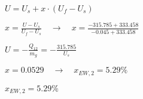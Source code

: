 \( U = U_s + x \cdot (U_f - U_s) \)  

\( x = \frac{U - U_s}{U_f - U_s} \quad \rightarrow \quad x = \frac{-315.785 + 333.458}{-0.045 + 333.458} \)  

\( U = -\frac{Q_{12}}{m_g} = -\frac{315.785}{U_s} \)  

\( x = 0.0529 \quad \rightarrow \quad x_{EW,2} = 5.29\% \)  

\( x_{EW,2} = 5.29\% \)